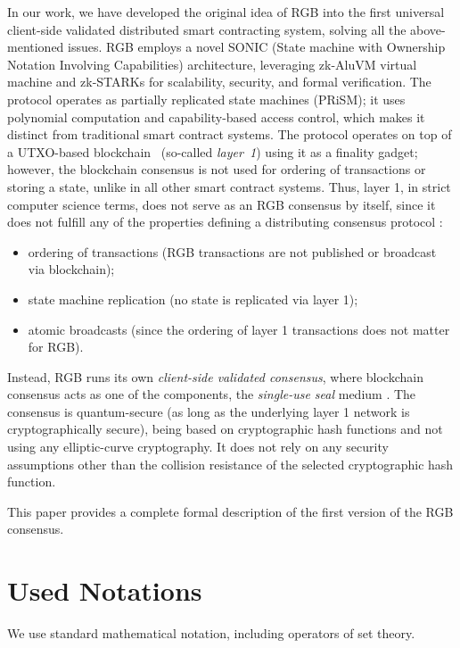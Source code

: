 \documentclass[9pt,oneside]{amsart}
\begin{document}
\begin{multicols}{2}
In our work, we have developed the original idea of RGB into the first universal
client-side validated distributed smart contracting system,
solving all the above-mentioned issues.
RGB employs a novel SONIC (State machine with Ownership Notation Involving Capabilities) architecture,
leveraging zk-AluVM virtual machine \cite{AluVM} and zk-STARKs \cite{STARKs}
for scalability, security, and formal verification.
The protocol operates as partially replicated state machines (PRiSM);
it uses polynomial computation and capability-based access control,
which makes it distinct from traditional smart contract systems.
The protocol operates on top of a UTXO-based blockchain~\cite{UTXO}
(so-called \emph{layer~1}) using it as a finality gadget;
however, the blockchain consensus is not used for ordering of transactions or storing a state,
unlike in all other smart contract systems.
Thus, layer 1, in strict computer science terms,
does not serve as an RGB consensus by itself,
since it does not fulfill any of the properties defining
a distributing consensus protocol \cite{consensus}:
\noindent\nopagebreak
\begin{itemize}
    \item ordering of transactions (RGB transactions are not published or broadcast via blockchain);
    \item state machine replication (no state is replicated via layer 1);
    \item atomic broadcasts (since the ordering of layer 1 transactions does not matter for RGB).
\end{itemize}

Instead, RGB runs its own \emph{client-side validated consensus}, where blockchain consensus
acts as one of the components, the \emph{single-use seal} medium \cite{LNPBP8}.
The consensus is quantum-secure (as long as the underlying layer 1 network is cryptographically secure),
being based on cryptographic hash functions and not using any elliptic-curve cryptography.
It does not rely on any security assumptions other than the collision resistance of the selected
cryptographic hash function.

This paper provides a complete formal description of the first version of the RGB consensus.

\section{Used Notations}

We use standard mathematical notation, including operators of set theory.


\end{multicols}
\end{document}
